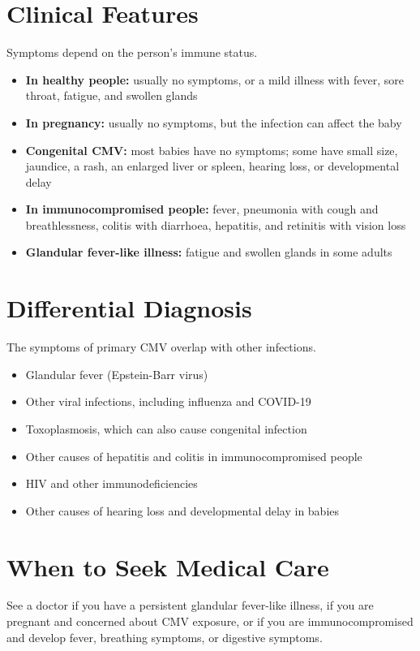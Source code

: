 \section*{Clinical Features}
Symptoms depend on the person's immune status.

\begin{itemize}
    \item \textbf{In healthy people:} usually no symptoms, or a mild illness with fever, sore throat, fatigue, and swollen glands
    \item \textbf{In pregnancy:} usually no symptoms, but the infection can affect the baby
    \item \textbf{Congenital CMV:} most babies have no symptoms; some have small size, jaundice, a rash, an enlarged liver or spleen, hearing loss, or developmental delay
    \item \textbf{In immunocompromised people:} fever, pneumonia with cough and breathlessness, colitis with diarrhoea, hepatitis, and retinitis with vision loss
    \item \textbf{Glandular fever-like illness:} fatigue and swollen glands in some adults
\end{itemize}

\section*{Differential Diagnosis}
The symptoms of primary CMV overlap with other infections.

\begin{itemize}
    \item Glandular fever (Epstein-Barr virus)
    \item Other viral infections, including influenza and COVID-19
    \item Toxoplasmosis, which can also cause congenital infection
    \item Other causes of hepatitis and colitis in immunocompromised people
    \item HIV and other immunodeficiencies
    \item Other causes of hearing loss and developmental delay in babies
\end{itemize}

\section*{When to Seek Medical Care}
See a doctor if you have a persistent glandular fever-like illness, if you are pregnant and concerned about CMV exposure, or if you are immunocompromised and develop fever, breathing symptoms, or digestive symptoms.

